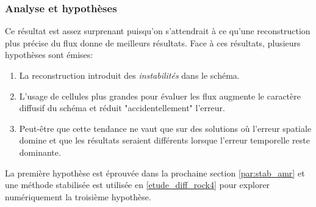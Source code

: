 \subsubsection{Analyse et hypothèses}
Ce résultat est assez surprenant puisqu'on s'attendrait à ce qu'une reconstruction plus précise du flux donne de meilleurs résultats.
Face à ces résultats, plusieurs hypothèses sont émises:
\begin{enumerate}
    \item La reconstruction introduit des \textit{instabilités} dans le schéma.
    \item L'usage de cellules plus grandes pour évaluer les flux augmente le caractère diffusif du schéma et réduit "accidentellement" l'erreur.
    \item Peut-être que cette tendance ne vaut que sur des solutions où l'erreur spatiale domine et que les résultats seraient différents lorsque l'erreur temporelle reste dominante.
\end{enumerate}
La première hypothèse est éprouvée dans la prochaine section \ref{par:stab_amr} et une méthode stabilisée est utilisée en \ref{etude_diff_rock4} pour explorer numériquement la troisième hypothèse.